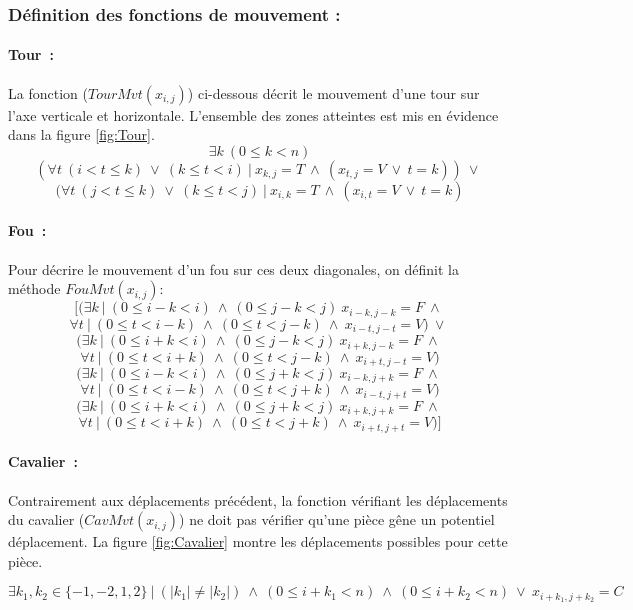 \documentclass[a4paper,11pt]{article}
\newcommand{\AND}{~\wedge~}
\newcommand{\OR}{~\vee~}
\newcommand{\TQ}{~|~}
\begin{document}
		\subsubsection{Définition des fonctions de mouvement :}
        	
          \paragraph{Tour~:} La fonction ($TourMvt(x_{i, j})$) ci-dessous décrit le mouvement d'une tour sur l'axe verticale et horizontale. L'ensemble des zones atteintes est mis en évidence dans la figure \ref{fig:Tour}.
          	\[\exists k~(0 \leq k < n) \]
            \[(\forall t~(i < t \leq k) \OR (k \leq t < i) \TQ x_{k, j} = T \AND (x_{t, j} = V \OR t = k)) \OR\]
            \[(\forall t~(j < t \leq k) \OR (k \leq t < j) \TQ x_{i, k} = T \AND (x_{i, t} = V \OR t = k) \]
            
          \paragraph{Fou~:} Pour décrire le mouvement d'un fou sur ces deux diagonales, on définit la méthode $FouMvt(x_{i, j})$:
            \[[(\exists k \TQ (0 \leq i-k < i) \AND (0 \leq j-k < j) ~ x_{i-k, j-k} = F \AND \]
            \[\forall t \TQ (0 \leq t < i-k) \AND (0 \leq t < j-k) \AND x_{i-t, j-t} = V ) \OR \]
            \[(\exists k \TQ (0 \leq i+k < i) \AND (0 \leq j-k < j) ~ x_{i+k, j-k} = F \AND \]
            \[\forall t \TQ (0 \leq t < i+k) \AND (0 \leq t < j-k) \AND x_{i+t, j-t} = V )\]
            \[(\exists k \TQ (0 \leq i-k < i) \AND (0 \leq j+k < j) ~ x_{i-k, j+k} = F \AND \]
            \[\forall t \TQ (0 \leq t < i-k) \AND (0 \leq t < j+k) \AND x_{i-t, j+t} = V )\]
            \[(\exists k \TQ (0 \leq i+k < i) \AND (0 \leq j+k < j) ~ x_{i+k, j+k} = F \AND \]
            \[\forall t \TQ (0 \leq t < i+k) \AND (0 \leq t < j+k) \AND x_{i+t, j+t} = V)]\]
            
          \paragraph{Cavalier~:}
          	Contrairement aux déplacements précédent, la fonction vérifiant les déplacements du cavalier ($CavMvt(x_{i, j})$) ne doit pas vérifier qu'une pièce gêne un potentiel déplacement.  La figure \ref{fig:Cavalier} montre les déplacements possibles pour cette pièce.
             
            	\[\exists k_{1}, k_{2} \in \{-1, -2, 1, 2\} \TQ (|k_{1}| \neq |k_{2}|) \AND (0 \leq i+k_{1} < n) \AND (0 \leq i+k_{2} < n) \OR x_{i+k_{1}, j+k_{2}} = C\]
                
\end{document}
